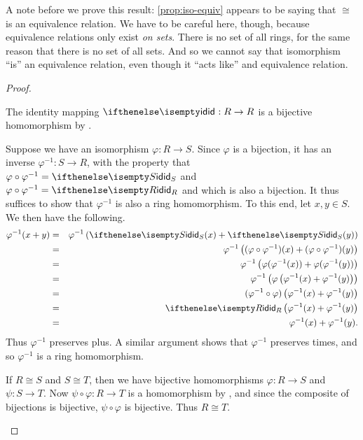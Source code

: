 A note before we prove this result: \ref{prop:iso-equiv} appears to be saying that \(\cong\) is an equivalence relation.
We have to be careful here, though, because equivalence relations only exist \emph{on sets}.
There is no set of all rings, for the same reason that there is no set of all sets.
And so we cannot say that isomorphism ``is'' an equivalence relation, even though it ``acts like'' and equivalence relation.

\begin{proof}
\begin{inlineproplist}
\item The identity mapping \(\ID : R \rightarrow R\) is a bijective homomorphism by .
\item Suppose we have an isomorphism \(\varphi : R \rightarrow S\).
Since \(\varphi\) is a bijection, it has an inverse \(\varphi^{-1} : S \rightarrow R\), with the property that \(\varphi \circ \varphi^{-1} = \ID[S]\) and \(\varphi \circ \varphi^{-1} = \ID[R]\) and which is also a bijection.
It thus suffices to show that \(\varphi^{-1}\) is also a ring homomorphism.
To this end, let \(x,y \in S\).
We then have the following.
\begin{eqnarray*}
\varphi^{-1}(x + y) & = & \varphi^{-1}\left(\ID[S](x) + \ID[S](y)\right) \\
 & = & \varphi^{-1}\left( (\varphi \circ \varphi^{-1})(x) + (\varphi \circ \varphi^{-1})(y) \right) \\
 & = & \varphi^{-1}\left( \varphi(\varphi^{-1}(x)) + \varphi(\varphi^{-1}(y)) \right) \\
 & = & \varphi^{-1}\left( \varphi\left( \varphi^{-1}(x) + \varphi^{-1}(y) \right) \right) \\
 & = & (\varphi^{-1} \circ \varphi)\left( \varphi^{-1}(x) + \varphi^{-1}(y) \right) \\
 & = & \ID[R]\left( \varphi^{-1}(x) + \varphi^{-1}(y) \right) \\
 & = & \varphi^{-1}(x) + \varphi^{-1}(y).
\end{eqnarray*}
Thus \(\varphi^{-1}\) preserves plus.
A similar argument shows that \(\varphi^{-1}\) preserves times, and so \(\varphi^{-1}\) is a ring homomorphism.
\item If \(R \cong S\) and \(S \cong T\), then we have bijective homomorphisms \(\varphi : R \rightarrow S\) and \(\psi : S \rightarrow T\).
Now \(\psi \circ \varphi : R \rightarrow T\) is a homomorphism by , and since the composite of bijections is bijective, \(\psi \circ \varphi\) is bijective.
Thus \(R \cong T\).
\end{inlineproplist}
\end{proof}

